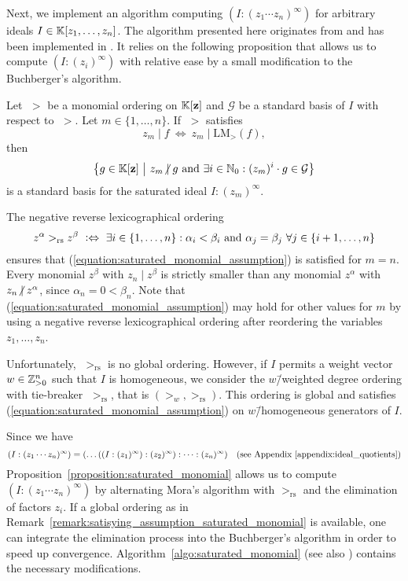 Next, we implement an algorithm computing $(I : (z_1\cdots z_n)^\infty)$ for arbitrary ideals $I\in\mathbb{K}[z_1,\dots,z_n]$. The algorithm presented here originates from \cite{gitfan_symmetry} and has been implemented in \gitfanlib. It relies on the following proposition that allows us to compute $(I : (z_i)^\infty)$ with relative ease by a small modification to the Buchberger's algorithm.

\begin{prop}
	\label{proposition:saturated_monomial}
	Let $\;>$ be a monomial ordering on $\mathbb{K}[\mathbf{z}]$ and $\mathcal{G}$ be a standard basis of $I$ with respect to $\;>$. Let $m\in\{1,\dots,n\}$. If $\;>$ satisfies
	\begin{equation}
		\label{equation:saturated_monomial_assumption}
		z_m \mid f\ \Leftrightarrow\ z_m \mid \text{LM}_>(f),
	\end{equation}
	then
	$$\left\{g\in\field[\mathbf{z}]\ \middle|\ z_m \centernot\mid g\ \mathrm{and}\ \exists i\in\natural_0: (z_m)^i \cdot g \in \mathcal{G}\right\}$$
	is a standard basis for the saturated ideal $I : (z_m)^\infty$. 
\end{prop}

\begin{remark}
	\label{remark:satisying_assumption_saturated_monomial}
	The negative reverse lexicographical ordering
	$$z^\alpha >_\text{rs} z^\beta\ \defequiv\ \exists i\in\{1,\dots,n\}: \alpha_i < \beta_i\ \text{and}\ \alpha_j = \beta_j\ \forall j\in\{i+1,\dots,n\}$$
	ensures that (\ref{equation:saturated_monomial_assumption}) is satisfied for $m=n$. Every monomial $z^\beta$ with $z_n \mid z^\beta$ is strictly smaller than any monomial $z^\alpha$ with $z_n \centernot\mid z^\alpha$, since $\alpha_n = 0 < \beta_n$. Note that (\ref{equation:saturated_monomial_assumption}) may hold for other values for $m$ by using a negative reverse lexicographical ordering after reordering the variables $z_1,\dots,z_n$.
	
	Unfortunately, $\;>_\text{rs}$ is no global ordering. However, if $I$ permits a weight vector $w\in\mathbb{Z}^n_{>0}$ such that $I$ is homogeneous, we consider the $w$\=/weighted degree ordering with tie-breaker $\;>_\text{rs}$, that is $(>_w, >_\text{rs})$. This ordering is global and satisfies (\ref{equation:saturated_monomial_assumption}) on $w$\=/homogeneous generators of $I$.
\end{remark}

Since we have
$$(I:(z_1\cdots z_n)^\infty) = (\dots((I:(z_1)^\infty):(z_2)^\infty):\dots : (z_n)^\infty)\quad\text{(see Appendix \ref{appendix:ideal_quotients})}$$
Proposition~\ref{proposition:saturated_monomial} allows us to compute $(I : (z_1\cdots z_n)^\infty)$ by alternating Mora's algorithm with $>_\text{rs}$ and the elimination of factors $z_i$. If a global ordering as in Remark~\ref{remark:satisying_assumption_saturated_monomial} is available, one can integrate the elimination process into the Buchberger's algorithm in order to speed up convergence. Algorithm~\ref{algo:saturated_monomial} (see also \cite[Algorithm 3.3]{gitfan_symmetry}) contains the necessary modifications.

